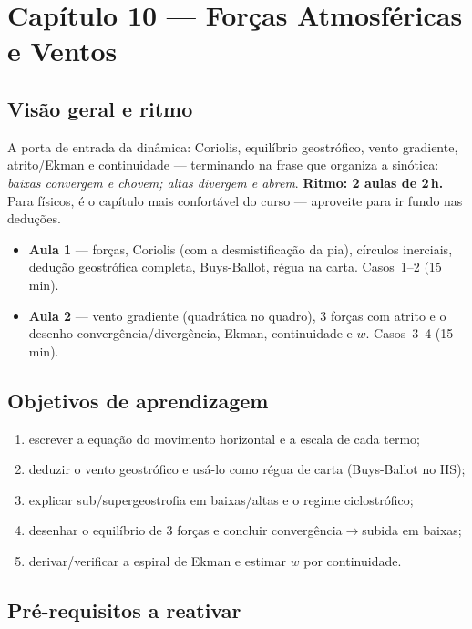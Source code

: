 \section{Capítulo 10 --- Forças Atmosféricas e Ventos}

\subsection*{Visão geral e ritmo}

A porta de entrada da dinâmica: Coriolis, equilíbrio geostrófico, vento
gradiente, atrito/Ekman e continuidade — terminando na frase que organiza a
sinótica: \emph{baixas convergem e chovem; altas divergem e abrem}.
\textbf{Ritmo: 2 aulas de 2\,h.} Para físicos, é o capítulo mais
confortável do curso — aproveite para ir fundo nas deduções.

\begin{itemize}
  \item \textbf{Aula 1} — forças, Coriolis (com a desmistificação da pia),
        círculos inerciais, dedução geostrófica completa, Buys-Ballot,
        régua na carta. Casos~1--2 (15\,min).
  \item \textbf{Aula 2} — vento gradiente (quadrática no quadro), 3 forças
        com atrito e o desenho convergência/divergência, Ekman,
        continuidade e $w$. Casos~3--4 (15\,min).
\end{itemize}

\subsection*{Objetivos de aprendizagem}

\begin{enumerate}
  \item escrever a equação do movimento horizontal e a escala de cada
        termo;
  \item deduzir o vento geostrófico e usá-lo como régua de carta
        (Buys-Ballot no HS);
  \item explicar sub/supergeostrofia em baixas/altas e o regime
        ciclostrófico;
  \item desenhar o equilíbrio de 3 forças e concluir
        convergência$\to$subida em baixas;
  \item derivar/verificar a espiral de Ekman e estimar $w$ por
        continuidade.
\end{enumerate}

\subsection*{Pré-requisitos a reativar}

